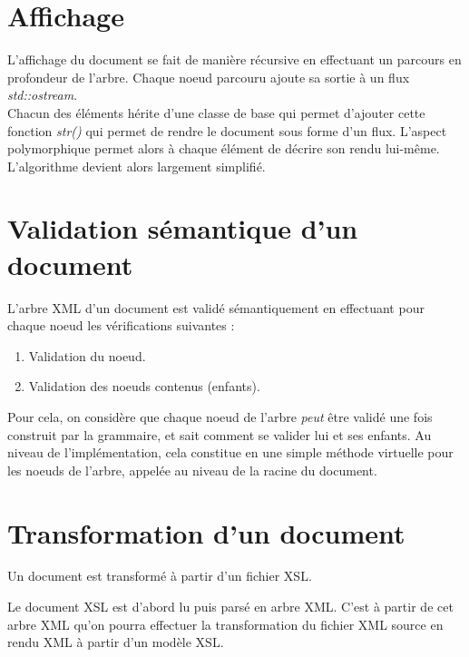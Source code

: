 \documentclass[10pt, a4paper]{article}
\begin{document}
\section{Affichage}\label{affichage}

L'affichage du document se fait de manière récursive en effectuant un
parcours en profondeur de l'arbre. Chaque noeud parcouru ajoute sa
sortie à un flux \emph{std::ostream}. \\

Chacun des éléments hérite d'une classe de base qui permet d'ajouter
cette fonction \emph{str()} qui permet de rendre le document sous forme
d'un flux. L'aspect polymorphique permet alors à chaque élément de
décrire son rendu lui-même. L'algorithme devient alors largement
simplifié.

\section{Validation sémantique d'un
document}\label{validation-suxe9mantique-dun-document}

L'arbre XML d'un document est validé sémantiquement en effectuant pour
chaque noeud les vérifications suivantes :

\begin{enumerate}
\def\labelenumi{\arabic{enumi}.}
\itemsep1pt\parskip0pt
\item
  Validation du noeud.
\item
  Validation des noeuds contenus (enfants).
\end{enumerate}

Pour cela, on considère que chaque noeud de l'arbre \emph{peut} être
validé une fois construit par la grammaire, et sait comment se valider
lui et ses enfants. Au niveau de l'implémentation, cela constitue en une
simple méthode virtuelle pour les noeuds de l'arbre, appelée au niveau
de la racine du document.

\section{Transformation d'un
document}\label{transformation-dun-document}

Un document est transformé à partir d'un fichier XSL.

Le document XSL est d'abord lu puis parsé en arbre XML. C'est à partir
de cet arbre XML qu'on pourra effectuer la transformation du fichier XML
source en rendu XML à partir d'un modèle XSL. \\
\end{document}
